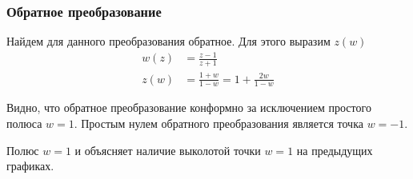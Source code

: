 \begin{frame}\frametitle{Обратное преобразование}
	Найдем для данного преобразования обратное.
	Для этого выразим \(z(w)\)
	\begin{align*}
		w(z) & = \frac{z-1}{z+1}                      \\
		z(w) & = \frac{1+w}{1-w} = 1 + \frac{2w}{1-w}
	\end{align*}

	Видно, что обратное преобразование конформно за исключением
	простого полюса \(w = 1\).
	Простым нулем обратного преобразования является точка \(w = -1\).

	Полюс \(w = 1\) и объясняет наличие выколотой точки \(w = 1\)
	на предыдущих графиках.
\end{frame}
